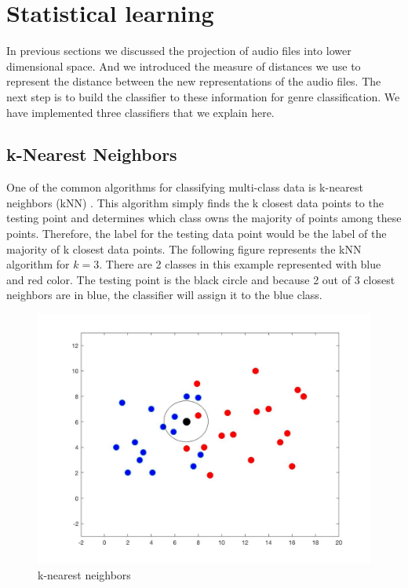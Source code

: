 \documentclass[12pt]{article}
\begin{document}
\section{Statistical learning}\label{sec:stat}
In previous sections we discussed the projection of audio files into lower dimensional space. And we introduced the measure of distances we use to represent the distance between the new representations of the audio files. The next step is to build the classifier to these information for genre classification. We have implemented three classifiers that we explain here.
\subsection{k-Nearest Neighbors}
One of the common algorithms for classifying multi-class data is k-nearest neighbors (kNN) \cite{li}. This algorithm simply finds the k closest data points to the testing point and determines which class owns the majority of points among these points. Therefore, the label for the testing data point would be the label of the majority of k closest data points.
The following figure represents the kNN algorithm for $k = 3$. There are 2 classes in this example represented with blue and red color. The testing point is the black circle and because 2 out of 3 closest neighbors are in blue, the classifier will assign it to the blue class.
\begin{figure}[H]\label{kNN}
	\centering
	\includegraphics[width=.8\linewidth]{kNN.jpg}
	\caption{k-nearest neighbors}
\end{figure}
\end{document}
